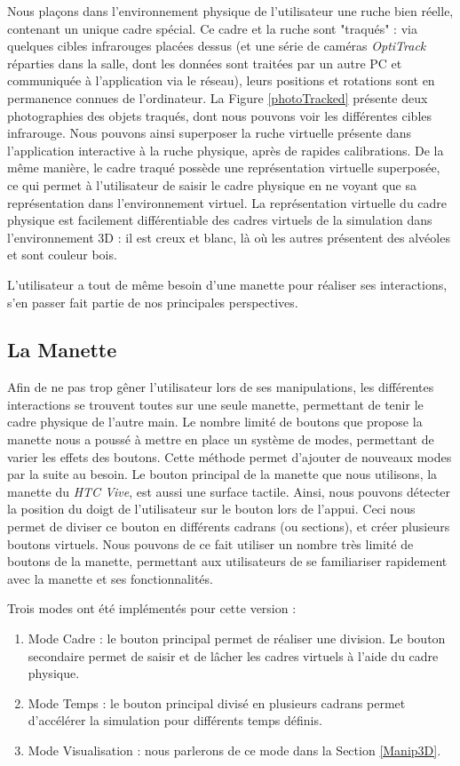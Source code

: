 		Nous plaçons dans l'environnement physique de l'utilisateur une ruche bien réelle, contenant un unique cadre spécial. Ce cadre et la ruche sont "traqués" : via quelques cibles infrarouges placées dessus (et une série de caméras \textit{OptiTrack} réparties dans la salle, dont les données sont traitées par un autre PC et communiquée à l'application via le réseau), leurs positions et rotations sont en permanence connues de l'ordinateur. La Figure \ref{photoTracked} présente deux photographies des objets traqués, dont nous pouvons voir les différentes cibles infrarouge. Nous pouvons ainsi superposer la ruche virtuelle présente dans l'application interactive à la ruche physique, après de rapides calibrations. De la même manière, le cadre traqué possède une représentation virtuelle superposée, ce qui permet à l'utilisateur de saisir le cadre physique en ne voyant que sa représentation dans l'environnement virtuel. La représentation virtuelle du cadre physique est facilement différentiable des cadres virtuels de la simulation dans l'environnement 3D : il est creux et blanc, là où les autres présentent des alvéoles et sont couleur bois.
		
		L'utilisateur a tout de même besoin d'une manette pour réaliser ses interactions, s'en passer fait partie de nos principales perspectives.	
		
		\subsection{La Manette}		
		Afin de ne pas trop gêner l'utilisateur lors de ses manipulations, les différentes interactions se trouvent toutes sur une seule manette, permettant de tenir le cadre physique de l'autre main. Le nombre limité de boutons que propose la manette nous a poussé à mettre en place un système de modes, permettant de varier les effets des boutons. Cette méthode permet d'ajouter de nouveaux modes par la suite au besoin. 		
		Le bouton principal de la manette que nous utilisons, la manette du \textit{HTC Vive}, est aussi une surface tactile. Ainsi, nous pouvons détecter la position du doigt de l'utilisateur sur le bouton lors de l'appui. Ceci nous permet de diviser ce bouton en différents cadrans (ou sections), et créer plusieurs boutons virtuels. Nous pouvons de ce fait utiliser un nombre très limité de boutons de la manette, permettant aux utilisateurs de se familiariser rapidement avec la manette et ses fonctionnalités. 
		
		Trois modes ont été implémentés pour cette version :		
		\begin{enumerate}
			\item Mode Cadre : le bouton principal permet de réaliser une division. Le bouton secondaire permet de saisir et de lâcher les cadres virtuels à l'aide du cadre physique.
			\item Mode Temps : le bouton principal divisé en plusieurs cadrans permet d'accélérer la simulation pour différents temps définis.
			\item Mode Visualisation : nous parlerons de ce mode dans la Section \ref{Manip3D}.
		\end{enumerate}
		
